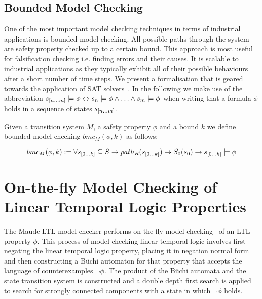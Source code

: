 \subsection*{Bounded Model Checking}
One of the most important model checking techniques in terms of industrial applications is bounded model checking. All possible paths through the system are safety property checked up to a certain bound. This approach is most useful for falsification checking i.e. finding errors and their causes. It is scalable to industrial applications as they typically exhibit all of their possible behaviours after a short number of time steps. We present a formalisation that is geared towards the application of SAT solvers~\cite{EC01}. In the following we make use of the abbreviation $s_{{[}n \ldots m {]}} \models \phi \leftrightarrow s_n \models \phi \wedge \ldots \wedge  s_m \models \phi$ when writing that a formula $\phi$ holds in a sequence of states $s_{{[}n \ldots m {]}}$.
\medskip
\begin{mydef}
Given a transition system $M$, a safety property $\phi$ and a bound $k$ we define bounded model checking $bmc_M(\phi,k)$ as follows:

$$bmc_M(\phi,k):= \forall s_{{[}0 \ldots k {]}} \subseteq S \to  path_R(s_{{[}0 \ldots k {]}}) \to S_0(s_0) \to s_{{[}0 \ldots k {]}} \models \phi$$
\end{mydef}
\medskip
\section{On-the-fly Model Checking of Linear Temporal Logic Properties}
The Maude LTL model checker performs on-the-fly model checking~\cite{CC91} of an LTL property $\phi$.
This process of model checking linear temporal logic involves first  negating the linear temporal  logic property, placing it in negation normal form and then constructing a B{\"u}chi automaton for that property that accepts the language of counterexamples $\neg \phi$. The product of the B{\"u}chi automata and the state transition system is constructed and a double depth first search is applied to search for strongly connected components with a state in which $\neg \phi$ holds.

